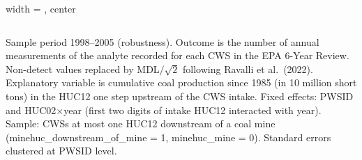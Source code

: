 \begin{table}[htbp]
\begin{adjustbox}{width = \textwidth, center}
\begin{tabular}{lccc}
         \bottomrule
         
      \end{tabular}
      
      
      
   \end{adjustbox}
      {\tiny\linespread{1}\selectfont \par \raggedright 
   Sample period 1998--2005 (robustness). Outcome is the number of annual measurements of the analyte recorded for each CWS in the EPA 6-Year Review. Non-detect values replaced by MDL$/\sqrt{2}$ following Ravalli et al.~(2022). Explanatory variable is cumulative coal production since 1985 (in 10 million short tons) in the HUC12 one step upstream of the CWS intake. Fixed effects: PWSID and HUC02$\times$year (first two digits of intake HUC12 interacted with year). Sample: CWSs at most one HUC12 downstream of a coal mine (minehuc\_downstream\_of\_mine = 1, minehuc\_mine = 0). Standard errors clustered at PWSID level.}
   
\end{table}


